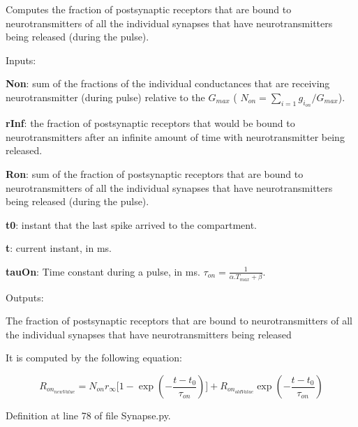 Computes the fraction of postsynaptic receptors that are bound to neurotransmitters of all the individual synapses that have neurotransmitters being released (during the pulse). 


\begin{DoxyItemize}
\item Inputs\+:
\begin{DoxyItemize}
\item {\bfseries Non}\+: sum of the fractions of the individual conductances that are receiving neurotransmitter (during pulse) relative to the $G_{max}$ ( $N_{on}=\limits\sum_{i=1}g_{i_{on}}/G_{max}$).
\item {\bfseries r\+Inf}\+: the fraction of postsynaptic receptors that would be bound to neurotransmitters after an infinite amount of time with neurotransmitter being released.
\item {\bfseries Ron}\+: sum of the fraction of postsynaptic receptors that are bound to neurotransmitters of all the individual synapses that have neurotransmitters being released (during the pulse).
\item {\bfseries t0}\+: instant that the last spike arrived to the compartment.
\item {\bfseries t}\+: current instant, in ms.
\item {\bfseries tau\+On}\+: Time constant during a pulse, in ms. $\tau_{on}=\frac{1}{\alpha.T_{max} +\beta}$.
\end{DoxyItemize}
\item Outputs\+:
\begin{DoxyItemize}
\item The fraction of postsynaptic receptors that are bound to neurotransmitters of all the individual synapses that have neurotransmitters being released
\end{DoxyItemize}
\end{DoxyItemize}

It is computed by the following equation\+:

\begin{equation} R_{on_{newValue}} = N_{on}r_{\infty}\Bigg[1-\exp\left(-\frac{t-t_0}{\tau_{on}}\right)\Bigg] + R_{on_{oldValue}}\exp\left(-\frac{t-t_0}{\tau_{on}}\right) \end{equation} 

Definition at line 78 of file Synapse.\+py.

